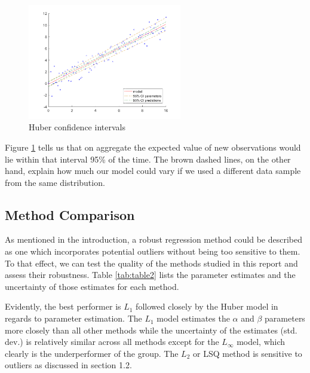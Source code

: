 \begin{figure}[htb]
\centering
\includegraphics[width=0.6\textwidth]{../img/Huber_CI}
\caption{Huber confidence intervals}
\label{fig:HuberCI}
\end{figure} 


Figure \ref{fig:HuberCI} tells us that on aggregate the expected value of new observations would lie within that interval 95\% of the time.  The brown dashed lines, on the other hand, explain how much our model could vary if we used a different data sample from the same distribution.


\subsection{Method Comparison}

As mentioned in the introduction, a robust regression method could be described as one which incorporates potential outliers without being too sensitive to them. To that effect, we can test the quality of the methods studied in this report and assess their robustness. Table \ref{tab:table2} lists the parameter estimates and the uncertainty of those estimates for each method.  

Evidently, the best performer is $L_1$ followed closely by the Huber model in regards to parameter estimation. The $L_1$ model estimates the $\alpha$ and $\beta$ parameters more closely than all other methods while the uncertainty of the estimates (std. dev.) is relatively similar across all methods except for the $L_\infty$ model, which clearly is the underperformer of the group. The $L_2$ or LSQ method is sensitive to outliers as discussed in section 1.2. 

\begin{table}[htb]
\centering

\caption{}
\label{tab:table1}
\end{table}



